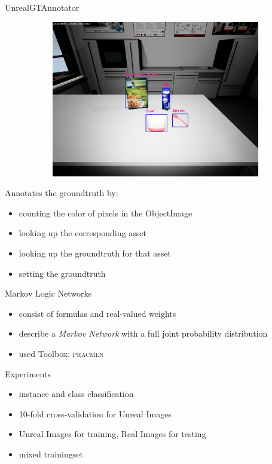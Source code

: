 \documentclass[]{beamer}
\begin{document}
\begin{frame}{UnrealGTAnnotator}
\begin{figure}
\begin{subfigure}[b]{0.3\textwidth}
		\includegraphics[scale=.08]{img/gt.png}	
	\end{subfigure}
\end{figure}
Annotates the groundtruth by:
	\begin{itemize}
		\item counting the color of pixels in the ObjectImage
		\item looking up the corresponding asset 
		\item looking up the groundtruth for that asset
		\item setting the groundtruth 
	\end{itemize}
\end{frame}


\begin{frame}{Markov Logic Networks}
	\begin{itemize}
		\item consist of formulas and real-valued weights
		\item describe a \textit{Markov Network} with a full joint probability distribution
		\item used Toolbox: \textsc{pracmln}
	\end{itemize}
\end{frame}


\begin{frame}{Experiments}
	\begin{itemize}
		\item instance and class classification
		\item 10-fold cross-validation for Unreal Images
		\item Unreal Images for training, Real Images for testing
		\item mixed trainingset
	\end{itemize}
\end{frame}
\end{document}
